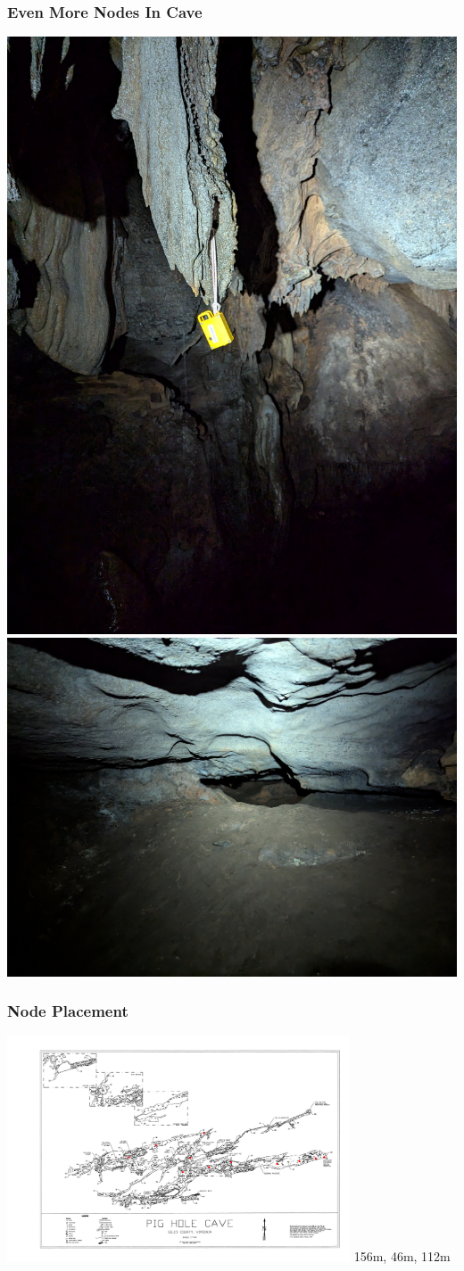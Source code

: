\documentclass{beamer}
\begin{document}
\begin{frame}
\frametitle{Even More Nodes In Cave}

\begin{center}
\includegraphics[width=.47\textwidth]{../images/PXL_20250610_231822265.LONG_EXPOSURE-01.COVER.jpg}\hfill
\includegraphics[width=.47\textwidth]{../images/PXL_20250610_231836339.LONG_EXPOSURE.jpg}
\end{center}

\end{frame}

\begin{frame}
\frametitle{Node Placement}

\begin{center}
\includegraphics[width=4.0in]{../images/Pig Hole Cave-10Jun25-mesh.png}
156m, 46m, 112m
\end{center}

\end{frame}
\end{document}
